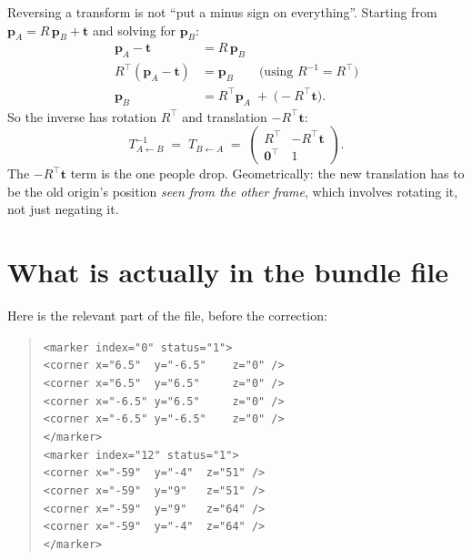 \documentclass[11pt,a4paper]{article}
\newcommand{\T}[2]{T_{#1 \leftarrow #2}}   %
\newcommand{\vt}[1]{\mathbf{#1}}
\begin{document}
Reversing a transform is not ``put a minus sign on everything''. Starting from
$\vt{p}_A = R\,\vt{p}_B + \vt{t}$ and solving for $\vt{p}_B$:
\begin{align}
  \vt{p}_A - \vt{t} &= R\,\vt{p}_B \\
  R^{\!\top}(\vt{p}_A - \vt{t}) &= \vt{p}_B
    \qquad\text{(using } R^{-1} = R^{\!\top}\text{)}\\
  \vt{p}_B &= R^{\!\top}\vt{p}_A \;+\; \bigl(-R^{\!\top}\vt{t}\bigr).
\end{align}
So the inverse has rotation $R^{\!\top}$ and translation $-R^{\!\top}\vt{t}$:
\begin{equation}
  \T{A}{B}^{-1} \;=\; \T{B}{A} \;=\;
  \begin{pmatrix}
    R^{\!\top} & -R^{\!\top}\vt{t} \\[2pt]
    \vt{0}^{\!\top} & 1
  \end{pmatrix}.
  \label{eq:inverse}
\end{equation}
The $-R^{\!\top}\vt{t}$ term is the one people drop. Geometrically: the new translation
has to be the old origin's position \emph{seen from the other frame}, which involves
rotating it, not just negating it.

\section{What is actually in the bundle file}

Here is the relevant part of the file, before the correction:

\begin{quote}\ttfamily\small
\begin{tabbing}
\texttt{<marker index="0" status="1">}\\
\quad\=\texttt{<corner x="6.5"~~y="-6.5"~~~~z="0" />}\\
\>\texttt{<corner x="6.5"~~y="6.5"~~~~~z="0" />}\\
\>\texttt{<corner x="-6.5" y="6.5"~~~~~z="0" />}\\
\>\texttt{<corner x="-6.5" y="-6.5"~~~~z="0" />}\\
\texttt{</marker>}\\[4pt]
\texttt{<marker index="12" status="1">}\\
\>\texttt{<corner x="-59"~~y="-4"~~z="51" />}\\
\>\texttt{<corner x="-59"~~y="9"~~~z="51" />}\\
\>\texttt{<corner x="-59"~~y="9"~~~z="64" />}\\
\>\texttt{<corner x="-59"~~y="-4"~~z="64" />}\\
\texttt{</marker>}
\end{tabbing}
\end{quote}
\end{document}
